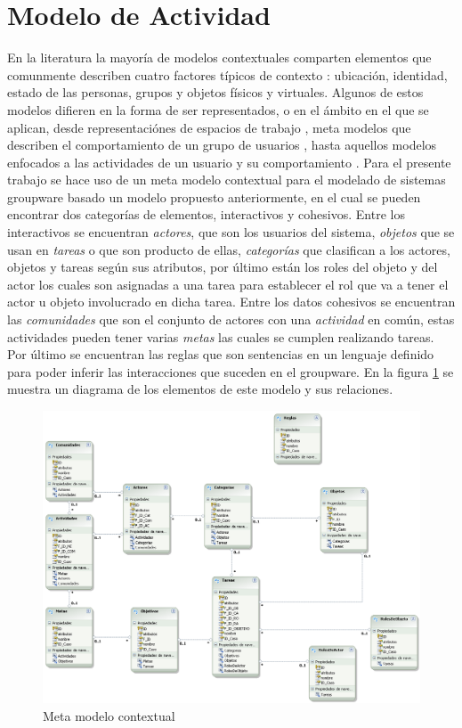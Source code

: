 \section{Modelo de Actividad}
En la literatura la mayor\'ia de modelos contextuales comparten elementos que comunmente describen cuatro factores t\'ipicos de contexto \cite{abowd1999towards}: ubicaci\'on, identidad, estado de las personas, grupos y objetos f\'isicos y virtuales. Algunos de estos modelos difieren en la forma de ser representados, o en el \'ambito en el que se aplican, desde representaci\'ones de espacios de trabajo \cite{decouchant2013adapting}, meta modelos que describen el comportamiento de un grupo de usuarios \cite{montane2013context} \cite{alves2013radiator} \cite{hoyos2013domain}, hasta aquellos modelos enfocados a las actividades de un usuario y su comportamiento \cite{kamoun2012fadyrcos}\cite{gallardo2012framework}\cite{guermah2013ontology}\cite{Doweling2012ATheory}. Para el presente trabajo se hace uso de un meta modelo contextual para el modelado de sistemas groupware basado un modelo propuesto anteriormente\cite{montane2013context}, en el cual se pueden encontrar dos categor\'ias de elementos, interactivos y cohesivos.  Entre los interactivos se encuentran \textit{actores}, que son los usuarios del sistema, \textit{objetos} que se usan en \textit{tareas} o que son producto de ellas, \textit{categor\'ias} que clasifican a los actores, objetos y tareas seg\'un sus atributos, por \'ultimo est\'an los roles del objeto y del actor los cuales son asignadas a una tarea para establecer el rol que va a tener el actor u objeto involucrado en dicha tarea. Entre los datos cohesivos se encuentran las \textit{comunidades} que son el conjunto de actores con una \textit{actividad} en com\'un, estas actividades pueden tener varias \textit{metas} las cuales se cumplen realizando tareas. Por \'ultimo se encuentran las reglas que son sentencias en un lenguaje definido para poder inferir las interacciones que suceden en el groupware. En la figura \ref{cmp:mmc} se muestra un diagrama de los elementos de este modelo y sus relaciones.

\begin{figure}[h!]
  \centering
    \includegraphics[scale=0.35]{images/modelo}
  \caption{Meta modelo contextual}
  \label{cmp:mmc}
\end{figure}

